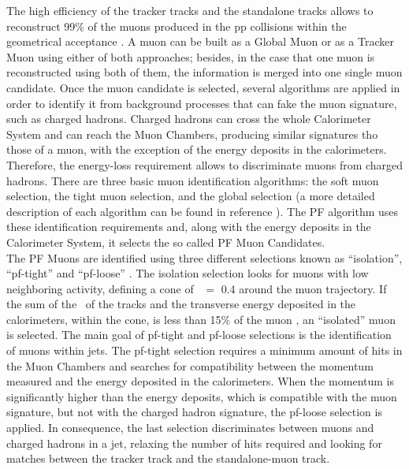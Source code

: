 \noindent The high efficiency of the tracker tracks and the standalone tracks
allows to reconstruct 99$\%$ of the muons produced in the pp collisions within the geometrical 
acceptance \cite{MuonID7TeV}. A muon can be built as a Global Muon or as a Tracker Muon using either 
of both approaches; besides, in the case that one muon is reconstructed using both of 
them, the information is merged into one single muon candidate. Once the muon 
candidate is selected, several algorithms are applied in order to 
identify it from background processes that can fake the muon 
signature, such as charged hadrons. Charged hadrons can cross the whole 
Calorimeter System and can reach the Muon Chambers, producing similar signatures tho those of a muon,
with the exception of the energy deposits in the calorimeters. Therefore, the energy-loss requirement 
 allows to discriminate muons from charged hadrons. There are three basic muon identification 
 algorithms: the soft muon selection, the tight muon selection, and the global 
 selection (a more detailed description of each algorithm can be found in 
 reference \cite{MuonID7TeV}). The PF algorithm uses these identification
 requirements and, along with the energy deposits in the Calorimeter System, it selects 
 the so called PF Muon Candidates. \\

\noindent  The PF Muons are identified using three different selections known as ``isolation'', ``pf-tight''
 and ``pf-loose'' \cite{PFMuonAndElectron}. The isolation selection looks for muons with low neighboring activity, defining 
 a cone of \DR~$=$ 0.4 around the muon trajectory. If the sum of the \pt~of the tracks and the 
 transverse energy deposited in the calorimeters, within the cone, is less than 15$\%$ of the muon \pt, an ``isolated'' muon 
 is selected. The main goal of pf-tight and pf-loose selections is the identification of muons within jets. The 
 pf-tight selection requires a minimum amount of hits in the Muon Chambers and searches for compatibility between 
 the momentum measured and the energy deposited in the calorimeters. When the momentum is 
 significantly higher than the energy deposits, which is compatible with the muon signature, 
 but not with the charged hadron signature, the pf-loose selection is applied. In consequence, the last selection 
 discriminates between muons and charged hadrons in a jet, relaxing the number of hits required 
 and looking for matches between the tracker track and the standalone-muon track. \\
  
